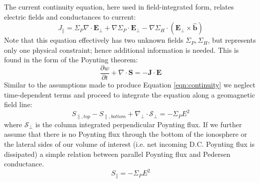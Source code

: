 \documentclass[11pt,letterpaper]{article}
\begin{document}
The current continuity equation, here used in field-integrated form, relates electric fields and conductances to current:
\begin{equation}
\boxed{
J_\parallel = \Sigma_P \nabla \cdot \mathbf{E}_\perp + \nabla \Sigma_P \cdot \mathbf{E}_\perp - \nabla \Sigma_H \cdot \left( \mathbf{E}_\perp \times \hat{\mathbf{b}} \right)
} \label{eqn:continuity}
\end{equation}
Note that this equation effectively has two unknown fields $\Sigma_P,\Sigma_H$, but represents only one physical constraint; hence additional information is needed.  This is found in the form of the Poynting theorem:
\begin{equation}
\frac{\partial w}{\partial t} + \nabla \cdot \mathbf{S} = - \mathbf{J} \cdot \mathbf{E}
\end{equation}
Similar to the assumptions made to produce Equation \ref{eqn:continuity} we neglect time-dependent terms and proceed to integrate the equation along a geomagnetic field line:
\begin{equation}
S_{\parallel,top} - S_{\parallel,bottom} + \nabla_\perp \cdot \mathbf{\mathcal{S}}_\perp = - \Sigma_P E^2
\end{equation}
where $\mathbf{\mathcal{S}}_\perp$ is the column integrated perpendicular Poynting flux.  If we further assume that there is no Poynting flux through the bottom of the ionosphere or the lateral sides of our volume of interest (i.e. net incoming D.C. Poynting flux is dissipated) a simple relation between parallel Poynting flux and Pedersen conductance.  
\begin{equation}
\boxed{
S_{\parallel}  = - \Sigma_P E^2
}
\end{equation}
\end{document}
